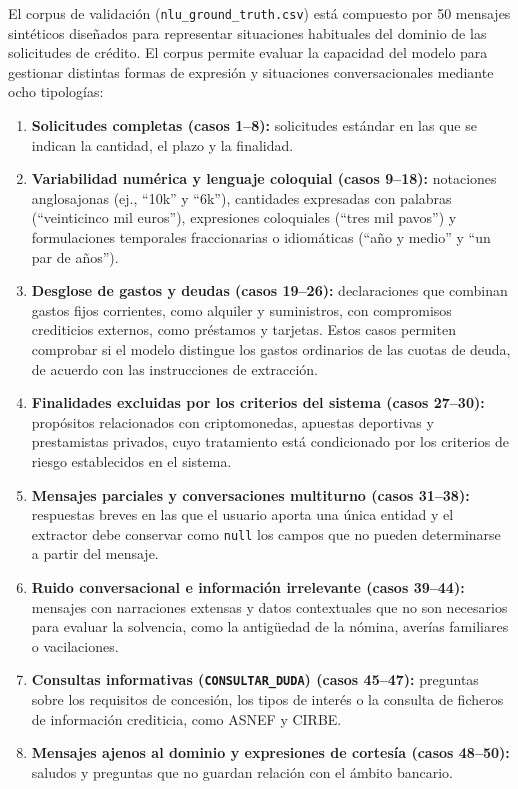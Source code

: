 \documentclass[12pt,a4paper]{report}
\begin{document}
El corpus de validación (\texttt{nlu\_ground\_truth.csv}) está compuesto por 50 mensajes sintéticos diseñados para representar situaciones habituales del dominio de las solicitudes de crédito. El corpus permite evaluar la capacidad del modelo para gestionar distintas formas de expresión y situaciones conversacionales mediante ocho tipologías:

\begin{enumerate}
    \item \textbf{Solicitudes completas (casos 1--8):} solicitudes estándar en las que se indican la cantidad, el plazo y la finalidad.
    \item \textbf{Variabilidad numérica y lenguaje coloquial (casos 9--18):} notaciones anglosajonas (ej., ``10k'' y ``6k''), cantidades expresadas con palabras (``veinticinco mil euros''), expresiones coloquiales (``tres mil pavos'') y formulaciones temporales fraccionarias o idiomáticas (``año y medio'' y ``un par de años'').
    \item \textbf{Desglose de gastos y deudas (casos 19--26):} declaraciones que combinan gastos fijos corrientes, como alquiler y suministros, con compromisos crediticios externos, como préstamos y tarjetas. Estos casos permiten comprobar si el modelo distingue los gastos ordinarios de las cuotas de deuda, de acuerdo con las instrucciones de extracción.
    \item \textbf{Finalidades excluidas por los criterios del sistema (casos 27--30):} propósitos relacionados con criptomonedas, apuestas deportivas y prestamistas privados, cuyo tratamiento está condicionado por los criterios de riesgo establecidos en el sistema.
    \item \textbf{Mensajes parciales y conversaciones multiturno (casos 31--38):} respuestas breves en las que el usuario aporta una única entidad y el extractor debe conservar como \texttt{null} los campos que no pueden determinarse a partir del mensaje.
    \item \textbf{Ruido conversacional e información irrelevante (casos 39--44):} mensajes con narraciones extensas y datos contextuales que no son necesarios para evaluar la solvencia, como la antigüedad de la nómina, averías familiares o vacilaciones.
    \item \textbf{Consultas informativas (\texttt{CONSULTAR\_DUDA}) (casos 45--47):} preguntas sobre los requisitos de concesión, los tipos de interés o la consulta de ficheros de información crediticia, como ASNEF y CIRBE.
    \item \textbf{Mensajes ajenos al dominio y expresiones de cortesía (casos 48--50):} saludos y preguntas que no guardan relación con el ámbito bancario.
\end{enumerate}
\end{document}
